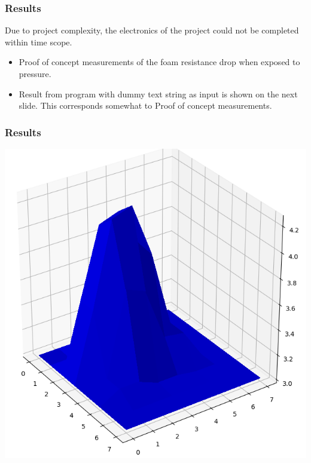 \documentclass{beamer}
\begin{document}
\begin{frame}
    \frametitle{Results}
    \begin{center}
        Due to project complexity, the electronics of the project could not be completed within time scope.
    \end{center}
    \begin{itemize}
        \item Proof of concept measurements of the foam resistance drop when exposed to pressure.
        \item Result from program with dummy text string as input is shown on the next slide. This corresponds somewhat to Proof of concept measurements.
    \end{itemize}

\end{frame}

\begin{frame}
    \frametitle{Results}
    \begin{center}
        \includegraphics[width=.6\textwidth]{img/foam_plot.png}
    \end{center}

\end{frame}
\end{document}
